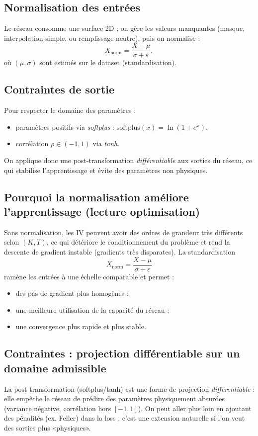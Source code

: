 \documentclass[11pt,a4paper]{report}
\theoremstyle{definition}
\theoremstyle{plain}
\theoremstyle{remark}
\newcommand{\1}{\mathbf{1}}
\begin{document}
\subsection*{Normalisation des entrées}
Le réseau consomme une surface 2D ; on gère les valeurs manquantes (masque, interpolation simple, ou remplissage neutre), puis on normalise :
\[
X_{\text{norm}} = \frac{X-\mu}{\sigma+\varepsilon},
\]
où $(\mu,\sigma)$ sont estimés sur le dataset (standardisation).

\subsection*{Contraintes de sortie}
Pour respecter le domaine des paramètres :
\begin{itemize}[leftmargin=*]
\item paramètres positifs via \emph{softplus} : $\text{softplus}(x)=\ln(1+e^x)$,
\item corrélation $\rho\in(-1,1)$ via \emph{tanh}.
\end{itemize}
On applique donc une post-transformation \emph{différentiable} aux sorties du réseau, ce qui stabilise l'apprentissage et évite des paramètres non physiques.

\subsection*{Pourquoi la normalisation améliore l'apprentissage (lecture optimisation)}
Sans normalisation, les IV peuvent avoir des ordres de grandeur très différents selon $(K,T)$, ce qui détériore le conditionnement du problème et rend la descente de gradient instable (gradients très disparates).
La standardisation
\[
X_{\text{norm}}=\frac{X-\mu}{\sigma+\varepsilon}
\]
ramène les entrées à une échelle comparable et permet :
\begin{itemize}[leftmargin=*]
\item des pas de gradient plus homogènes ;
\item une meilleure utilisation de la capacité du réseau ;
\item une convergence plus rapide et plus stable.
\end{itemize}

\subsection*{Contraintes : projection différentiable sur un domaine admissible}
La post-transformation (softplus/tanh) est une forme de projection \emph{différentiable} :
elle empêche le réseau de prédire des paramètres physiquement absurdes (variance négative, corrélation hors $[-1,1]$).
On peut aller plus loin en ajoutant des pénalités (ex. Feller) dans la loss ; c'est une extension naturelle si l'on veut des sorties plus «physiques».
\end{document}
